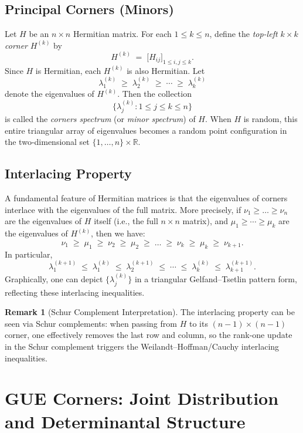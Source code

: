 \documentclass[letterpaper,11pt,oneside,reqno]{article}
\numberwithin{equation}{section}
\theoremstyle{definition}
\newtheorem{remark}[proposition]{Remark}
\begin{document}
\subsection{Principal Corners (Minors)}
Let $H$ be an $n\times n$ Hermitian matrix. For each $1\le k\le n$, define the \emph{top-left $k\times k$ corner} $H^{(k)}$ by 
\[
	H^{(k)} \;=\; \bigl[H_{ij}\bigr]_{1\le i,j \le k}.
\]
Since $H$ is Hermitian, each $H^{(k)}$ is also Hermitian. Let 
\[
	\lambda_1^{(k)} \;\ge\;\lambda_2^{(k)}\;\ge\;\cdots\;\ge\;\lambda_k^{(k)}
\]
denote the eigenvalues of $H^{(k)}$. Then the collection
\[
	\bigl\{\lambda_j^{(k)} : 1\le j\le k \le n\bigr\}
\]
is called the \emph{corners spectrum} (or \emph{minor spectrum}) of $H$. When $H$ is random, this entire triangular array of eigenvalues becomes a random point configuration in the two-dimensional set $\{1,\dots,n\}\times \mathbb{R}$.

\subsection{Interlacing Property}
A fundamental feature of Hermitian matrices is that the eigenvalues of corners interlace with the eigenvalues of the full matrix. More precisely, if $\nu_1\ge\dots\ge \nu_n$ are the eigenvalues of $H$ itself (i.e., the full $n\times n$ matrix), and $\mu_1\ge\cdots\ge\mu_k$ are the eigenvalues of $H^{(k)}$, then we have:
\[
	\nu_1\;\ge\;\mu_1\;\ge\;\nu_2\;\ge\;\mu_2\;\ge\;\dots\;\ge\;\nu_k\;\ge\;\mu_k\;\ge\;\nu_{k+1}.
\]
In particular,
\[
	\lambda_1^{(k+1)}
	\;\le\;\lambda_1^{(k)}\;\le\;\lambda_2^{(k+1)}
	\;\le\;\cdots\;\le\;\lambda_k^{(k)}
	\;\le\;\lambda_{k+1}^{(k+1)}.
\]
Graphically, one can depict $\{\lambda_j^{(k)}\}$ in a triangular Gelfand--Tsetlin pattern form, reflecting these interlacing inequalities.

\begin{remark}[Schur Complement Interpretation]
The interlacing property can be seen via Schur complements: when passing from $H$ to its $(n-1)\times(n-1)$ corner, one effectively removes the last row and column, so the rank-one update in the Schur complement triggers the Weilandt--Hoffman/Cauchy interlacing inequalities.
\end{remark}

\section{GUE Corners: Joint Distribution and Determinantal Structure}
\label{sec:gue-corners}
\end{document}
